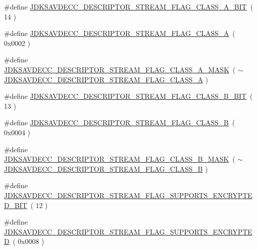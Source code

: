 \begin{DoxyCompactItemize}
\item 
\#define \hyperlink{group__descriptor__stream_ga62def82f8a6698cad70023ee2c77bdd9}{J\+D\+K\+S\+A\+V\+D\+E\+C\+C\+\_\+\+D\+E\+S\+C\+R\+I\+P\+T\+O\+R\+\_\+\+S\+T\+R\+E\+A\+M\+\_\+\+F\+L\+A\+G\+\_\+\+C\+L\+A\+S\+S\+\_\+\+A\+\_\+\+B\+IT}~( 14 )
\item 
\#define \hyperlink{group__descriptor__stream_ga5a54c0b32f11463c90d818dee6fc3d2f}{J\+D\+K\+S\+A\+V\+D\+E\+C\+C\+\_\+\+D\+E\+S\+C\+R\+I\+P\+T\+O\+R\+\_\+\+S\+T\+R\+E\+A\+M\+\_\+\+F\+L\+A\+G\+\_\+\+C\+L\+A\+S\+S\+\_\+A}~( 0x0002 )
\item 
\#define \hyperlink{group__descriptor__stream_ga857bec57a8a7f36fe88078053ece9db2}{J\+D\+K\+S\+A\+V\+D\+E\+C\+C\+\_\+\+D\+E\+S\+C\+R\+I\+P\+T\+O\+R\+\_\+\+S\+T\+R\+E\+A\+M\+\_\+\+F\+L\+A\+G\+\_\+\+C\+L\+A\+S\+S\+\_\+\+A\+\_\+\+M\+A\+SK}~( $\sim$\hyperlink{group__descriptor__stream_ga5a54c0b32f11463c90d818dee6fc3d2f}{J\+D\+K\+S\+A\+V\+D\+E\+C\+C\+\_\+\+D\+E\+S\+C\+R\+I\+P\+T\+O\+R\+\_\+\+S\+T\+R\+E\+A\+M\+\_\+\+F\+L\+A\+G\+\_\+\+C\+L\+A\+S\+S\+\_\+A} )
\item 
\#define \hyperlink{group__descriptor__stream_ga55a67221f4828045cf4ee74452f3aed5}{J\+D\+K\+S\+A\+V\+D\+E\+C\+C\+\_\+\+D\+E\+S\+C\+R\+I\+P\+T\+O\+R\+\_\+\+S\+T\+R\+E\+A\+M\+\_\+\+F\+L\+A\+G\+\_\+\+C\+L\+A\+S\+S\+\_\+\+B\+\_\+\+B\+IT}~( 13 )
\item 
\#define \hyperlink{group__descriptor__stream_ga077a134f37c43ef4433488f4cd02da68}{J\+D\+K\+S\+A\+V\+D\+E\+C\+C\+\_\+\+D\+E\+S\+C\+R\+I\+P\+T\+O\+R\+\_\+\+S\+T\+R\+E\+A\+M\+\_\+\+F\+L\+A\+G\+\_\+\+C\+L\+A\+S\+S\+\_\+B}~( 0x0004 )
\item 
\#define \hyperlink{group__descriptor__stream_gafdec8daf954c5e649a82c43d504b2f23}{J\+D\+K\+S\+A\+V\+D\+E\+C\+C\+\_\+\+D\+E\+S\+C\+R\+I\+P\+T\+O\+R\+\_\+\+S\+T\+R\+E\+A\+M\+\_\+\+F\+L\+A\+G\+\_\+\+C\+L\+A\+S\+S\+\_\+\+B\+\_\+\+M\+A\+SK}~( $\sim$\hyperlink{group__descriptor__stream_ga077a134f37c43ef4433488f4cd02da68}{J\+D\+K\+S\+A\+V\+D\+E\+C\+C\+\_\+\+D\+E\+S\+C\+R\+I\+P\+T\+O\+R\+\_\+\+S\+T\+R\+E\+A\+M\+\_\+\+F\+L\+A\+G\+\_\+\+C\+L\+A\+S\+S\+\_\+B} )
\item 
\#define \hyperlink{group__descriptor__stream_ga692333e33ca21c14b35f2db445b5f4e1}{J\+D\+K\+S\+A\+V\+D\+E\+C\+C\+\_\+\+D\+E\+S\+C\+R\+I\+P\+T\+O\+R\+\_\+\+S\+T\+R\+E\+A\+M\+\_\+\+F\+L\+A\+G\+\_\+\+S\+U\+P\+P\+O\+R\+T\+S\+\_\+\+E\+N\+C\+R\+Y\+P\+T\+E\+D\+\_\+\+B\+IT}~( 12 )
\item 
\#define \hyperlink{group__descriptor__stream_ga05c1eb950269a1a251f716c75bd3ffc5}{J\+D\+K\+S\+A\+V\+D\+E\+C\+C\+\_\+\+D\+E\+S\+C\+R\+I\+P\+T\+O\+R\+\_\+\+S\+T\+R\+E\+A\+M\+\_\+\+F\+L\+A\+G\+\_\+\+S\+U\+P\+P\+O\+R\+T\+S\+\_\+\+E\+N\+C\+R\+Y\+P\+T\+ED}~( 0x0008 )

\end{DoxyCompactItemize}
